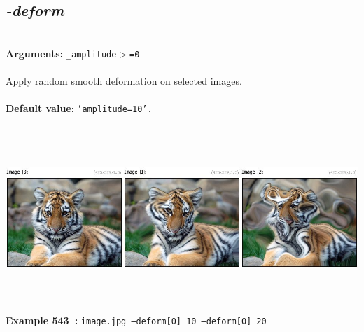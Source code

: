 \documentclass[a4paper,11pt,twoside]{book}
\begin{document}
\subsection{\emph{-deform} }\vspace*{-0.5em}
~\\\textbf{Arguments: } 
{\small \texttt{\_amplitude$>$=0}}\\~\\
Apply random smooth deformation on selected images.
~\\~\\\textbf{Default value}: {\small \texttt{'amplitude=10'.}}
\begin{center}\includegraphics[keepaspectratio=true,height=7cm,width=\textwidth]{img/gmic_def543.jpg}\\
{\footnotesize \textbf{Example 543~:} \texttt{image.jpg --deform[0] 10 --deform[0] 20}}
\end{center}
\end{document}
